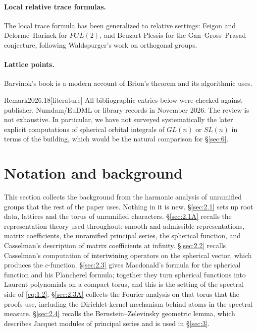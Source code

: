 \documentclass[12pt,letterpaper]{article}
\numberwithin{equation}{section}
\theoremstyle{plain}
\theoremstyle{remark}
\theoremstyle{plain}
\theoremstyle{definition}
\theoremstyle{remark}
\newcounter{rtw}
\theoremstyle{remark}
\begin{document}
\paragraph{Local relative trace formulas.} The local trace formula has been generalized to relative settings: Feigon \cite{Fe12} and Delorme--Harinck \cite{DH17} for $PGL(2)$, and Beuzart-Plessis \cite{BP20} for the Gan--Gross--Prasad conjecture, following Waldspurger's work on orthogonal groups.

\paragraph{Lattice points.} Barvinok's book \cite{Ba08} is a modern account of Brion's theorem and its algorithmic uses.

\begin{fixedrem}{Remark}{2026.18}[literature]
All bibliographic entries below were checked against publisher, Numdam/EuDML or library records in November 2026. The review is not exhaustive. In particular, we have not surveyed systematically the later explicit computations of spherical orbital integrals of $GL(n)$ or $SL(n)$ in terms of the building, which would be the natural comparison for \S\ref{sec:6}.
\end{fixedrem}

\section{Notation and background}\label{sec:2}

This section collects the background from the harmonic analysis of unramified groups that the rest of the paper uses. Nothing in it is new. \S\ref{sec:2.1} sets up root data, lattices and the torus of unramified characters. \S\ref{sec:2.1A} recalls the representation theory used throughout: smooth and admissible representations, matrix coefficients, the unramified principal series, the spherical function, and Casselman's description of matrix coefficients at infinity. \S\ref{sec:2.2} recalls Casselman's computation of intertwining operators on the spherical vector, which produces the $c$-function. \S\ref{sec:2.3} gives Macdonald's formula for the spherical function and his Plancherel formula; together they turn spherical functions into Laurent polynomials on a compact torus, and this is the setting of the spectral side of \eqref{eq:1.2}. \S\ref{sec:2.3A} collects the Fourier analysis on that torus that the proofs use, including the Dirichlet-kernel mechanism behind atoms in the spectral measure. \S\ref{sec:2.4} recalls the Bernstein--Zelevinsky geometric lemma, which describes Jacquet modules of principal series and is used in \S\ref{sec:3}.
\end{document}
